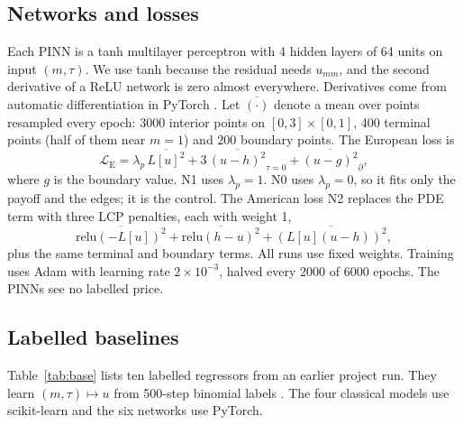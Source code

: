 \documentclass[conference]{IEEEtran}
\begin{document}
\subsection{Networks and losses}
Each PINN is a tanh multilayer perceptron with 4 hidden layers of 64 units on input $(m,\tau)$. We use tanh because the residual needs $u_{mm}$, and the second derivative of a ReLU network is zero almost everywhere. Derivatives come from automatic differentiation in PyTorch \cite{paszke2019pytorch}. Let $\overline{(\cdot)}$ denote a mean over points resampled every epoch: 3000 interior points on $[0,3]\times[0,1]$, 400 terminal points (half of them near $m=1$) and 200 boundary points. The European loss is
\begin{equation}
\mathcal L_{\mathrm{E}}=\lambda_{p}\,\overline{L[u]^2}+3\,\overline{(u-h)^2}_{\tau=0}+\overline{(u-g)^2}_{\partial}, \label{eq:le}
\end{equation}
where $g$ is the boundary value. N1 uses $\lambda_p=1$. N0 uses $\lambda_p=0$, so it fits only the payoff and the edges; it is the control. The American loss N2 replaces the PDE term with three LCP penalties, each with weight 1,
\begin{equation}
\overline{\mathrm{relu}(-L[u])^2}+\overline{\mathrm{relu}(h-u)^2}+\overline{(L[u](u-h))^2}, \label{eq:la}
\end{equation}
plus the same terminal and boundary terms. All runs use fixed weights. Training uses Adam with learning rate $2\times10^{-3}$, halved every 2000 of 6000 epochs. The PINNs see no labelled price.

\subsection{Labelled baselines}
Table~\ref{tab:base} lists ten labelled regressors from an earlier project run. They learn $(m,\tau)\mapsto u$ from 500-step binomial labels \cite{cox1979option}. The four classical models use scikit-learn \cite{pedregosa2011scikit} and the six networks use PyTorch.
\end{document}
